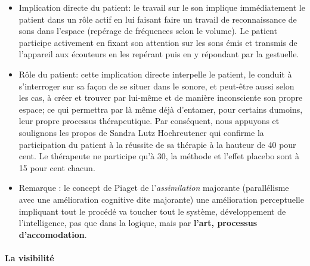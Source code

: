 \begin{itemize}
 \item Implication directe du
     patient: le travail sur le son implique immédiatement le patient
 dans un rôle actif en lui faisant faire un travail de reconnaissance de sons dans
 l'espace (repérage de fréquences selon le volume). Le patient
 participe activement en fixant son attention sur les
 sons émis et transmis de l'appareil aux écouteurs en les repérant
  puis en y
  répondant par la gestuelle.
  
  \item Rôle du patient: cette implication directe interpelle le patient, le conduit à
    s'interroger sur sa façon de 
    se situer dans le sonore, et  peut-être aussi selon les cas, à
    créer et trouver par lui-même et de manière
 inconsciente  
 son propre espace; ce  qui permettra par là même déjà d'entamer, pour certains dumoins, leur propre
 processus thérapeutique.
 Par conséquent, nous appuyons et soulignons  les propos de Sandra Lutz
 Hochreutener qui confirme la participation du patient à la réussite de sa thérapie à la hauteur de 
 40 pour cent. Le thérapeute ne participe qu'à 30, la
 méthode et l'effet placebo sont à 15 pour cent chacun.
 
 
  \item Remarque : le concept de Piaget de l'\textit{assimilation} majorante (parallélisme avec une amélioration cognitive dite majorante)
une amélioration perceptuelle impliquant tout le procédé va toucher tout le
système, développement de l'intelligence, pas que dans la logique, mais
par \textbf{l'art, 
processus d'accomodation}.

  
\end{itemize}

\paragraph{La visibilité}

